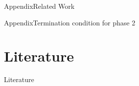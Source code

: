 \documentclass[aspectratio=169, hyperref={colorlinks=true, allcolors=SecondaryColor}, c]{beamer}
\begin{document}
	\begin{frame}[fragile]{Appendix}{Related Work}
	\end{frame}

	\begin{frame}[fragile]{Appendix}{Termination condition for phase 2}
	\end{frame}
\else
\fi

\ifliterature
	\section{Literature}

	\begin{frame}[allowframebreaks]{Literature}
		\printbibliography
	\end{frame}


\else
\fi
\end{document}
